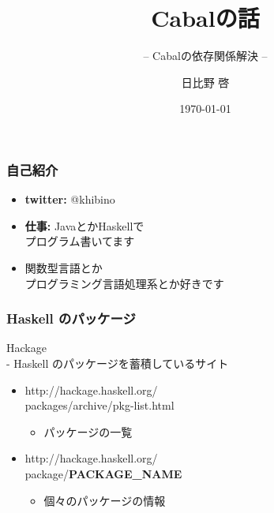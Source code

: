 \documentclass[cjk,dvipdfm,14pt]{beamer}
\title{Cabalの話}
\subtitle{-- Cabalの依存関係解決 --}
\author{日比野 啓}
\date{ \today }
\begin{document}
\begin{frame}
\maketitle
\end{frame}

\begin{frame}
\frametitle{自己紹介}

\begin{itemize}
\item {\bf twitter:} @khibino
\item {\bf 仕事:} JavaとかHaskellで\\プログラム書いてます
\item 関数型言語とか\\プログラミング言語処理系とか好きです
\end{itemize}

\end{frame}









\begin{frame}
\frametitle{Haskell のパッケージ}

Hackage \\- Haskell のパッケージを蓄積しているサイト

\begin{itemize}
\item http://hackage.haskell.org/\\packages/archive/pkg-list.html
  \begin{itemize}
  \item パッケージの一覧
  \end{itemize}
\item http://hackage.haskell.org/\\package/{\bf PACKAGE\_NAME}
  \begin{itemize}
  \item 個々のパッケージの情報
  \end{itemize}
\end{itemize}

\end{frame}
\end{document}
